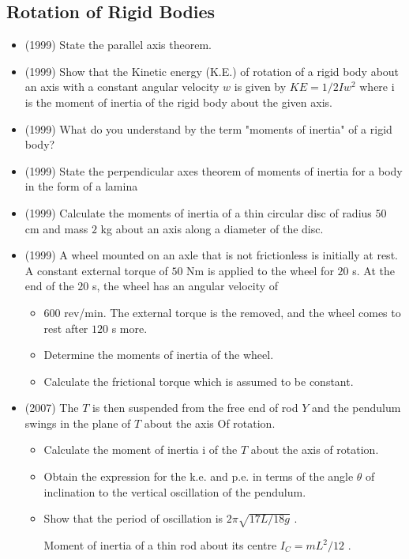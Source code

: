 \documentclass{article}
\begin{document}
\subsection{Rotation of Rigid Bodies}
\begin{itemize}
\item (1999)  State the parallel axis theorem.
\item (1999)  Show that the Kinetic energy (K.E.) of rotation of a rigid body about an axis with a constant angular velocity $ w$ is given by $ KE =1/2Iw^{2}$ where i is the moment of inertia of the rigid body about the given axis.
\item (1999)  What do you understand by the term "moments of inertia" of a rigid body?
\item (1999)  State the perpendicular axes theorem of moments of inertia for a body in the form of a lamina
\item (1999)  Calculate the moments of inertia of a thin circular disc of radius $ 50$ cm and mass $ 2$ kg about an axis along a diameter of the disc.
\item (1999)  A wheel mounted on an axle that is not frictionless is initially at rest. A constant external torque of $ 50$ Nm is applied to the wheel for $ 20$ s. At the end of the $ 20$ s, the wheel has an angular velocity of\begin{itemize}
\item $ 600$ rev/min. The external torque is the removed, and the wheel comes to rest after $ 120$ s more.
\item Determine the moments of inertia of the wheel.
\item Calculate the frictional torque which is assumed to be constant. 
\end{itemize}
\item (2007)  The $ T$ is then suspended from the free end of rod $ Y$ and the pendulum swings in the plane of $ T$ about the axis Of rotation.\begin{itemize}
\item Calculate the moment of inertia i of the $ T$ about the axis of rotation. 
\item Obtain the expression for the k.e. and p.e. in terms of the angle $ \theta $ of inclination to the vertical oscillation of the pendulum. 
\item Show that the period of oscillation is $ 2\pi\sqrt{17L/18g}$ . 
\item [ Moment of inertia of a thin rod about its centre $ I_{C}=mL^{2}/12$ . ] 
\end{itemize}

\end{itemize}
\end{document}
